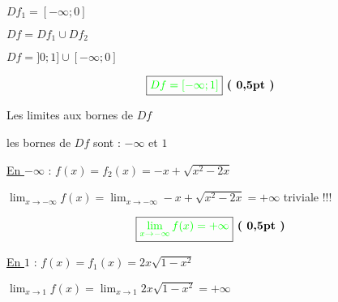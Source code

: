 \documentclass[12pt,a4paper]{article}
\begin{document}
\begin{enumerate}
    \underline{\( Df_1 = [-\infty;0] \)}
	    
	\( Df = Df_1 \cup Df_2 \)    
    
    \( Df = ]0;1] \cup [-\infty;0] \)
    
    \[ \boxed{\textcolor{green}{Df = [-\infty;1]}} \textbf{ ( 0,5pt )} \] 
    
    Les limites aux bornes de \( Df \)
    
	les bornes de \( Df \) sont  :  \(-\infty\) et \( 1 \)
    
\underline{En \(-\infty\)} : \( f(x) = f_{2}(x) = -x + \sqrt{x^2 - 2x} \)

\( \lim_{x \to -\infty} f(x) = \lim_{x \to -\infty} -x + \sqrt{x^2 - 2x} = +\infty \) triviale !!!

\[ \boxed{\textcolor{green}{ \lim_{x \to -\infty} f(x) = +\infty }} \textbf{ ( 0,5pt )} \]

\underline{En \( 1 \)} : \( f(x) = f_{1}(x) = 2x\sqrt{1 - x^2} \)

\( \lim_{x \to 1} f(x) = \lim_{x \to 1} 2x\sqrt{1 - x^2} = +\infty \)
\end{enumerate}
\end{document}
